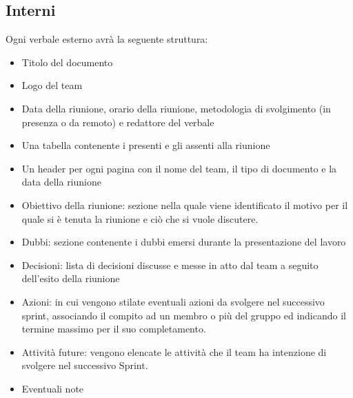 \documentclass{article}
\begin{document}
\subsection*{Interni}
Ogni verbale esterno avrà la seguente struttura:
\begin{itemize}
    \item Titolo del documento
    \item Logo del team
    \item Data della riunione, orario della riunione, metodologia di svolgimento (in presenza o da remoto) e redattore del verbale
    \item Una tabella contenente i presenti e gli assenti alla riunione
    \item Un header per ogni pagina con il nome del team, il tipo di documento e la data della riunione
    \item Obiettivo della riunione: sezione nella quale viene identificato il motivo per il quale si è tenuta la riunione e ciò che si vuole discutere. 
    \item Dubbi: sezione contenente i dubbi emersi durante la presentazione del lavoro
    \item Decisioni: lista di decisioni discusse e messe in atto dal team a seguito dell'esito della riunione
    \item Azioni: in cui vengono stilate eventuali azioni da svolgere nel successivo sprint, associando il compito ad un membro o più del gruppo ed indicando il termine massimo per il suo completamento.
    \item Attività future: vengono elencate le attività che il team ha intenzione di svolgere nel successivo Sprint. 
    \item Eventuali note
\end{itemize}
\end{document}
